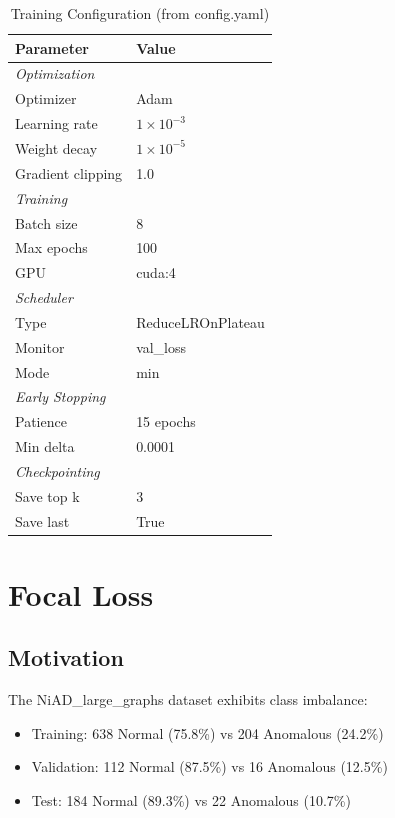 \begin{table}[H]
\centering
\caption{Training Configuration (from config.yaml)}
\label{tab:training_config}
\begin{tabular}{ll}
\toprule
\textbf{Parameter} & \textbf{Value} \\
\midrule
\multicolumn{2}{l}{\textit{Optimization}} \\
Optimizer & Adam \\
Learning rate & $1 \times 10^{-3}$ \\
Weight decay & $1 \times 10^{-5}$ \\
Gradient clipping & 1.0 \\
\midrule
\multicolumn{2}{l}{\textit{Training}} \\
Batch size & 8 \\
Max epochs & 100 \\
GPU & cuda:4 \\
\midrule
\multicolumn{2}{l}{\textit{Scheduler}} \\
Type & ReduceLROnPlateau \\
Monitor & val\_loss \\
Mode & min \\
\midrule
\multicolumn{2}{l}{\textit{Early Stopping}} \\
Patience & 15 epochs \\
Min delta & 0.0001 \\
\midrule
\multicolumn{2}{l}{\textit{Checkpointing}} \\
Save top k & 3 \\
Save last & True \\
\bottomrule
\end{tabular}
\end{table}

\section{Focal Loss}

\subsection{Motivation}

The NiAD\_large\_graphs dataset exhibits class imbalance:
\begin{itemize}
    \item Training: 638 Normal (75.8\%) vs 204 Anomalous (24.2\%)
    \item Validation: 112 Normal (87.5\%) vs 16 Anomalous (12.5\%)
    \item Test: 184 Normal (89.3\%) vs 22 Anomalous (10.7\%)
\end{itemize}

